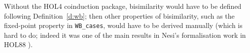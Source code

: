 
Without the  HOL4 coinduction package, bisimilarity would have to be
defined  following 
Definition~\ref{d:wb};  then other properties of bisimilarity, such
as the fixed-point property in \texttt{WB_cases}, would have to be
derived 
manually (which is hard to do; indeed it was one of the main results
in  Nesi's formalisation work  in HOL88 \cite{Nesi:1992ve}). 



